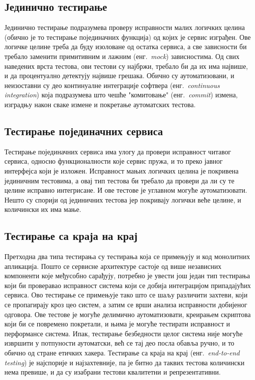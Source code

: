 \documentclass[12pt,oneside]{memoir}
\begin{document}
\subsection{Јединично тестирање}
Јединично тестирање подразумева проверу исправности малих логичких целина (обично је то тестирање појединачних функција) од којих је сервис изграђен. Ове логичке целине треба да буду изоловане од остатка сервиса, а све зависности би требало заменити примитивним и лажним (енг.~\textit{mock}) зависностима. Од свих наведених врста тестова, ови тестови су најбржи, требало би да их има највише, и да процентуално детектују највише грешака. Обично су аутоматизовани, и неизоставни су део континуалне интеграције софтвера (енг.~\textit{continuous integration}) која подразумева што чешће "комитовање" (енг.~\textit{commit}) измена, изградњу након сваке измене и покретање аутоматских тестова.

\subsection{Тестирање појединачних сервиса}
Тестирање појединачних сервиса има улогу да провери исправност читавог сервиса, односно функционалности које сервис пружа, и то преко јавног интерфејса који је изложен. Исправност мањих логичких целина је покривена јединичним тестовима, а овај тип тестова би требало да провери да ли су те целине исправно интегрисане. И ове тестове је углавном могуће аутоматизовати. Нешто су спорији од јединичних тестова јер покривају логички веће целине, и количински их има мање.

\subsection{Тестирање са краја на крај}
Претходна два типа тестирања су тестирања која се примењују и код монолитних апликација. Пошто се сервисне архитектуре састоје од више независних компоненти које међусобно сарађују, потребно је увести још један тип тестирања који би проверавао исправност система који се добија интеграцијом припадајућих сервиса. Ово тестирање се примењује тако што се шаљу различити захтеви, који се пропагирају кроз цео систем, а затим се врши анализа исправности добијеног одговора. Ове тестове је могуће делимично аутоматизовати, креирањем скриптова који би се повремено покретали, и њима је могуће тестирати исправност и перформансе система. Ипак, тестирање безбедности целог система није могуће извршити у потпуности аутоматски, већ се тај део посла обавља ручно, и то обично од стране етичких хакера. Тестирање са краја на крај (енг.~\textit{end-to-end testing}) је најспорије и најзахтевније, па је битно да таквих тестова количински нема превише, и да су изабрани тестови квалитетни и репрезентативни.
\end{document}

